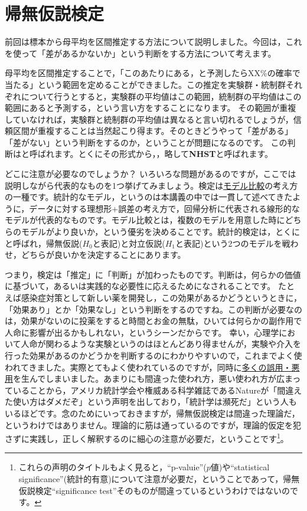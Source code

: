 \documentclass{ltjsbook}
\begin{document}
\chapter{帰無仮説検定}
\label{m18_NHST}
前回は標本から母平均を区間推定する方法について説明しました。今回は，これを使って「差があるかないか」という判断をする方法について考えます。

母平均を区間推定することで，「このあたりにある，と予測したらXX\%の確率で当たる」という範囲を定めることができました。この推定を実験群・統制群それぞれについて行うとすると，実験群の平均値はこの範囲，統制群の平均値はこの範囲にあると予測する，という言い方をすることになります。
その範囲が重複していなければ，実験群と統制群の平均値は異なると言い切れるでしょうが，信頼区間が重複することは当然起こり得ます。そのときどうやって「差がある」「差がない」という判断をするのか，ということが問題になるのです。
この判断はと呼ばれます。とくにその形式から，，略して\textbf{NHST}と呼ばれます。

\label{ModelComparison1}
どこに注意が必要なのでしょうか？ いろいろな問題があるのですが，ここでは説明しながら代表的なものを1つ挙げてみましょう。検定は\underline{モデル比較}の考え方の一種です。統計的なモデル，というのは本講義の中では一貫して述べてきたように，データに対する理想形+誤差の考え方で，回帰分析に代表される線形的なモデルが代表的なものです。モデル比較とは，複数のモデルを用意した時にどちらのモデルがより良いか，という優劣を決めることです。統計的検定は，とくにと呼ばれ，帰無仮説($H_0$と表記)と対立仮説($H_1$と表記)という2つのモデルを戦わせ，どちらが良いかを決定することにあります。

つまり，検定は「推定」に「判断」が加わったものです。判断は，何らかの価値に基づいて，あるいは実践的な必要性に応えるためになされることです。
たとえば感染症対策として新しい薬を開発し，この効果があるかどうというときに，「効果あり」とか「効果なし」という判断をするのですね。この判断が必要なのは，効果がないのに投薬をすると時間とお金の無駄，ひいては何らかの副作用で人命に影響が出るかもしれない，というシーンだからです。
幸い，心理学において人命が関わるような実験というのはほとんどあり得ませんが，実験や介入を行った効果があるのかどうかを判断するのにわかりやすいので，これまでよく使われてきました。実際とてもよく使われているのですが，同時に\underline{多くの誤用・悪用}を生んでしまいました。あまりにも間違った使われ方，悪い使われ方が広まっていることから，アメリカ統計学会や権威ある科学雑誌であるNatureが「間違えた使い方はダメだぞ」という声明を出しており\parencite{wasserstein2016asa,amrhein2019scientists}，「統計学は瀕死だ」という人もいるほどです\parencite{Toyoda202003}。念のためにいっておきますが，帰無仮説検定は間違った理論だ，というわけではありません。理論的に筋は通っているのですが，理論的仮定を犯さずに実践し，正しく解釈するのに細心の注意が必要だ，ということです\footnote{これらの声明のタイトルもよく見ると，``p-valuie''($p$値)や``statistical significance''(統計的有意)について注意が必要だ，ということであって，帰無仮説検定``significance test''そのものが間違っているというわけではないのです。}。
\end{document}
